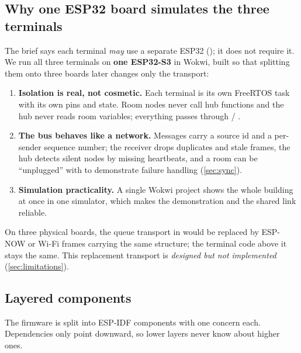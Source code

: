 \subsection{Why one ESP32 board simulates the three terminals}
\label{sec:one-board}
The brief says each terminal \emph{may} use a separate ESP32 (); it does not require it.
We run all three terminals on \textbf{one ESP32-S3} in Wokwi, built so that splitting them onto three
boards later changes only the transport:
\begin{enumerate}
  \item \textbf{Isolation is real, not cosmetic.} Each terminal is its own FreeRTOS task with its own
        pins and state. Room nodes never call hub functions and the hub never reads room variables;
        everything passes through  / .
  \item \textbf{The bus behaves like a network.} Messages carry a source id and a per-sender
        sequence number; the receiver drops duplicates and stale frames, the hub detects silent
        nodes by missing heartbeats, and a room can be ``unplugged'' with  to
        demonstrate failure handling (\cref{sec:sync}).
  \item \textbf{Simulation practicality.} A single Wokwi project shows the whole building at once
        in one simulator, which makes the demonstration and the shared link reliable.
\end{enumerate}
On three physical boards, the queue transport in  would be replaced by
ESP-NOW or Wi-Fi frames carrying the same  structure; the terminal code above it
stays the same. This replacement transport is \emph{designed but not implemented}
(\cref{sec:limitations}).

\subsection{Layered components}
The firmware is split into ESP-IDF components with one concern each. Dependencies only point
downward, so lower layers never know about higher ones.

